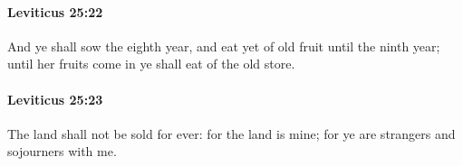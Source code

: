 		\paragraph{Leviticus 25:22} %
			\label{LEVITICUS-25-22}

			And ye shall sow the eighth year, and eat yet of old fruit until the ninth year; until her fruits come in ye shall eat of the old store.


		\paragraph{Leviticus 25:23} %
			\label{LEVITICUS-25-23}

			The land shall not be sold for ever: for the land is mine; for ye are strangers and sojourners with me.


